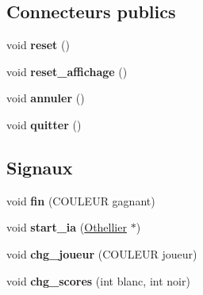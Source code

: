 \subsection*{Connecteurs publics}
\begin{DoxyCompactItemize}
\item 
void {\bfseries reset} ()\hypertarget{classOthellier_a376f9f9b9d08174bc2d2ab6e36e9b505}{}\label{classOthellier_a376f9f9b9d08174bc2d2ab6e36e9b505}

\item 
void {\bfseries reset\+\_\+affichage} ()\hypertarget{classOthellier_a312113b4f42c43b10b0ab602cd59f67c}{}\label{classOthellier_a312113b4f42c43b10b0ab602cd59f67c}

\item 
void {\bfseries annuler} ()\hypertarget{classOthellier_a81ed1f11d1471dea2fb4f5567cf9a1b7}{}\label{classOthellier_a81ed1f11d1471dea2fb4f5567cf9a1b7}

\item 
void {\bfseries quitter} ()\hypertarget{classOthellier_a3a2c45895df54ec7e5ea5bc93bc3b3e2}{}\label{classOthellier_a3a2c45895df54ec7e5ea5bc93bc3b3e2}

\end{DoxyCompactItemize}
\subsection*{Signaux}
\begin{DoxyCompactItemize}
\item 
void {\bfseries fin} (C\+O\+U\+L\+E\+UR gagnant)\hypertarget{classOthellier_a20f64c763665a10f4dd7055baaaf0c31}{}\label{classOthellier_a20f64c763665a10f4dd7055baaaf0c31}

\item 
void {\bfseries start\+\_\+ia} (\hyperlink{classOthellier}{Othellier} $\ast$)\hypertarget{classOthellier_a6a73f46c7ccbd3e957f439a3b0b5c9c0}{}\label{classOthellier_a6a73f46c7ccbd3e957f439a3b0b5c9c0}

\item 
void {\bfseries chg\+\_\+joueur} (C\+O\+U\+L\+E\+UR joueur)\hypertarget{classOthellier_a4d53350d7e47fb3448afebb221d63aa4}{}\label{classOthellier_a4d53350d7e47fb3448afebb221d63aa4}

\item 
void {\bfseries chg\+\_\+scores} (int blanc, int noir)\hypertarget{classOthellier_ac1140f99ca0ad23386fca06aab2ed0ac}{}\label{classOthellier_ac1140f99ca0ad23386fca06aab2ed0ac}

\end{DoxyCompactItemize}
